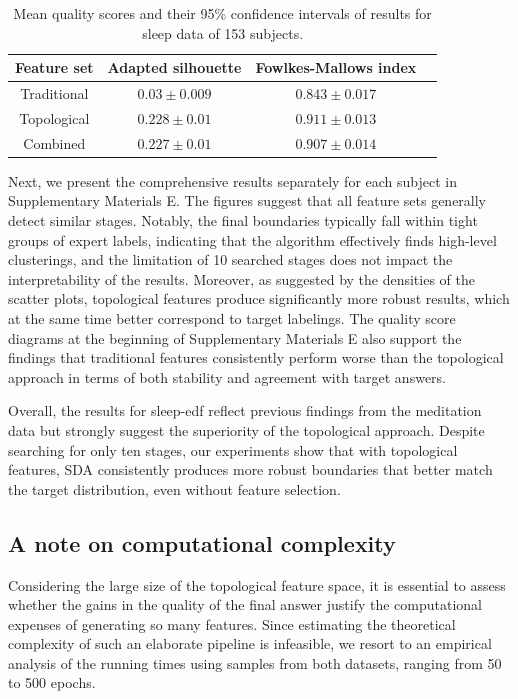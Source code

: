\documentclass[journal,twoside,web]{ieeecolor2}
\begin{document}
\begin{table}
\begin{center}
\caption{Mean quality scores and their 95\% confidence intervals of results for sleep data of 153 subjects.}
\label{table2}
\begin{tabular}{| c | c | c | c |}
  \hline
    Feature set & Adapted silhouette & Fowlkes-Mallows index \\
  \hline
    Traditional & $0.03 \pm 0.009$  & $0.843 \pm 0.017$ \\
    Topological & $0.228 \pm 0.01 $ & $0.911 \pm 0.013$ \\
    Combined &  $0.227 \pm 0.01 $ & $0.907 \pm 0.014$ \\
  \hline
\end{tabular}
\end{center}
\end{table}

Next, we present the comprehensive results separately for each subject in Supplementary Materials E. The figures suggest that all feature sets generally detect similar stages. Notably, the final boundaries typically fall within tight groups of expert labels, indicating that the algorithm effectively finds high-level clusterings, and the limitation of 10 searched stages does not impact the interpretability of the results. Moreover, as suggested by the densities of the scatter plots, topological features produce significantly more robust results, which at the same time better correspond to target labelings. The quality score diagrams at the beginning of Supplementary Materials E also support the findings that traditional features consistently perform worse than the topological approach in terms of both stability and agreement with target answers.

Overall, the results for sleep-edf reflect previous findings from the meditation data but strongly suggest the superiority of the topological approach. Despite searching for only ten stages, our experiments show that with topological features, SDA consistently produces more robust boundaries that better match the target distribution, even without feature selection.\@

\subsection{A note on computational complexity}

Considering the large size of the topological feature space, it is essential to assess whether the gains in the quality of the final answer justify the computational expenses of generating so many features. Since estimating the theoretical complexity of such an elaborate pipeline is infeasible, we resort to an empirical analysis of the running times using samples from both datasets, ranging from 50 to 500 epochs. 
\end{document}
